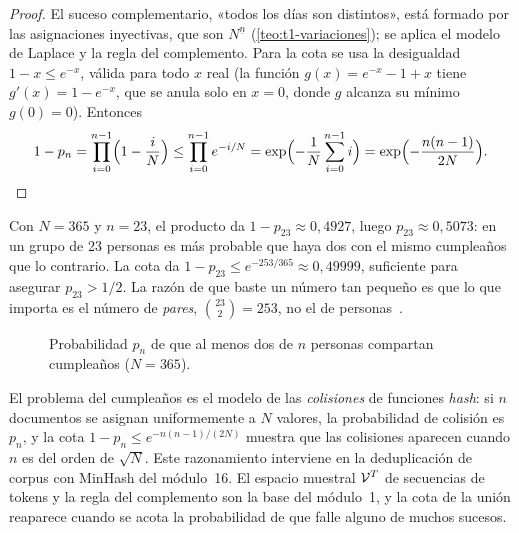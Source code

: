 \begin{proof}
El suceso complementario, «todos los días son distintos», está formado por las asignaciones inyectivas, que son $N^{\underline{n}}$ (\cref{teo:t1-variaciones}); se aplica el modelo de Laplace y la regla del complemento. Para la cota se usa la desigualdad $1-x\le e^{-x}$, válida para todo $x$ real (la función $g(x)=e^{-x}-1+x$ tiene $g'(x)=1-e^{-x}$, que se anula solo en $x=0$, donde $g$ alcanza su mínimo $g(0)=0$). Entonces
\[
1-p_n=\prod_{i=0}^{n-1}\Bigl(1-\frac iN\Bigr)\le\prod_{i=0}^{n-1}e^{-i/N}=\exp\Bigl(-\frac1N\sum_{i=0}^{n-1}i\Bigr)=\exp\Bigl(-\frac{n(n-1)}{2N}\Bigr).\qedhere
\]
\end{proof}

\begin{ejemplo}
Con $N=365$ y $n=23$, el producto da $1-p_{23}\approx0{,}4927$, luego $p_{23}\approx0{,}5073$: en un grupo de 23 personas es más probable que haya dos con el mismo cumpleaños que lo contrario. La cota da $1-p_{23}\le e^{-253/365}\approx0{,}49999$, suficiente para asegurar $p_{23}>1/2$. La razón de que baste un número tan pequeño es que lo que importa es el número de \emph{pares}, $\binom{23}{2}=253$, no el de personas~\cite[§16.4]{mcs}.
\end{ejemplo}

\begin{figure}[h]
\centering
{}
\caption{Probabilidad $p_n$ de que al menos dos de $n$ personas compartan cumpleaños ($N=365$).}
\label{fig:t3-cumple}
\end{figure}

\begin{observacion}
El problema del cumpleaños es el modelo de las \emph{colisiones} de funciones \emph{hash}: si $n$ documentos se asignan uniformemente a $N$ valores, la probabilidad de colisión es $p_n$, y la cota $1-p_n\le e^{-n(n-1)/(2N)}$ muestra que las colisiones aparecen cuando $n$ es del orden de $\sqrt{N}$. Este razonamiento interviene en la deduplicación de corpus con MinHash del módulo~16. El espacio muestral $\mathcal{V}^{T}$ de secuencias de tokens y la regla del complemento son la base del módulo~1, y la cota de la unión reaparece cuando se acota la probabilidad de que falle alguno de muchos sucesos.
\end{observacion}


